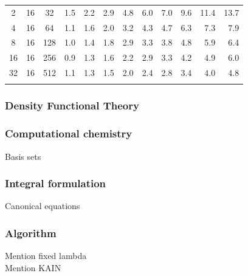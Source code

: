 \documentclass[mathserif]{beamer}
\begin{document}
\begin{frame}
\begin{table}
\begin{tabular}{cccrrrrrrrrr}
	  2& 16& 32	&  1.5 	&  2.2 	&  2.9 	&  4.8  &  6.0  &  7.0  &  9.6  & 11.4  & 13.7  \\
	  4& 16& 64	&  1.1 	&  1.6 	&  2.0 	&  3.2  &  4.3  &  4.7  &  6.3  &  7.3  &  7.9  \\
	  8& 16&128	&  1.0 	&  1.4 	&  1.8 	&  2.9  &  3.3  &  3.8  &  4.8  &  5.9  &  6.4  \\
	 16& 16&256	&  0.9 	&  1.3 	&  1.6 	&  2.2  &  2.9  &  3.3  &  4.2  &  4.9  &  6.0  \\
	 32& 16&512	&  1.1 	&  1.3 	&  1.5 	&  2.0  &  2.4  &  2.8  &  3.4  &  4.0  &  4.8  \\
	   &   &   	&      	&      	&      	&    	&    	&	&	&	&	\\
	\hline                                                                           
	\hline
    \end{tabular}
    \end{table}
\end{frame}

\begin{frame}
    \frametitle{Density Functional Theory}
\end{frame}

\begin{frame}
    \frametitle{Computational chemistry}
    Basis sets
\end{frame}

\begin{frame}
    \frametitle{Integral formulation}
    Canonical equations
\end{frame}

\begin{frame}
    \frametitle{Algorithm}
    Mention fixed lambda\\
    Mention KAIN
\end{frame}
\end{document}
